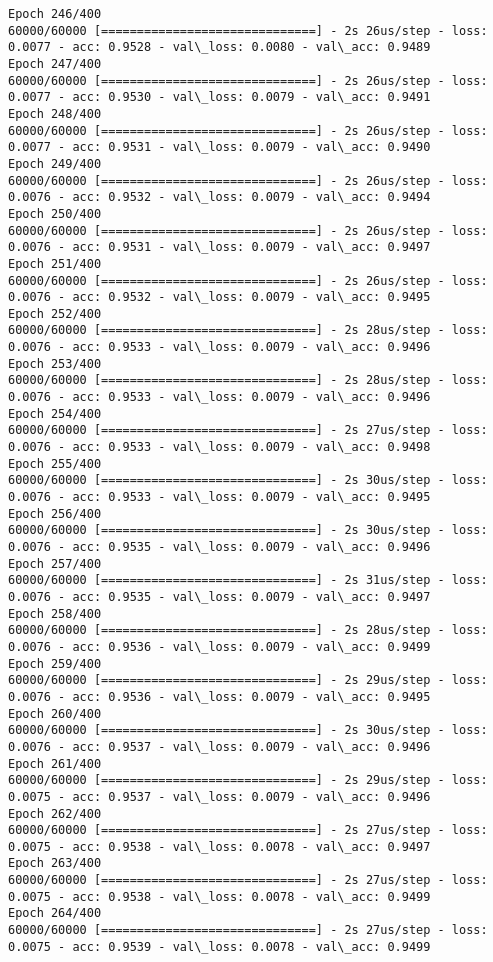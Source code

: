 \documentclass[11pt]{article}
\begin{document}
\begin{Verbatim}[commandchars=\\\{\}]
Epoch 246/400
60000/60000 [==============================] - 2s 26us/step - loss: 0.0077 - acc: 0.9528 - val\_loss: 0.0080 - val\_acc: 0.9489
Epoch 247/400
60000/60000 [==============================] - 2s 26us/step - loss: 0.0077 - acc: 0.9530 - val\_loss: 0.0079 - val\_acc: 0.9491
Epoch 248/400
60000/60000 [==============================] - 2s 26us/step - loss: 0.0077 - acc: 0.9531 - val\_loss: 0.0079 - val\_acc: 0.9490
Epoch 249/400
60000/60000 [==============================] - 2s 26us/step - loss: 0.0076 - acc: 0.9532 - val\_loss: 0.0079 - val\_acc: 0.9494
Epoch 250/400
60000/60000 [==============================] - 2s 26us/step - loss: 0.0076 - acc: 0.9531 - val\_loss: 0.0079 - val\_acc: 0.9497
Epoch 251/400
60000/60000 [==============================] - 2s 26us/step - loss: 0.0076 - acc: 0.9532 - val\_loss: 0.0079 - val\_acc: 0.9495
Epoch 252/400
60000/60000 [==============================] - 2s 28us/step - loss: 0.0076 - acc: 0.9533 - val\_loss: 0.0079 - val\_acc: 0.9496
Epoch 253/400
60000/60000 [==============================] - 2s 28us/step - loss: 0.0076 - acc: 0.9533 - val\_loss: 0.0079 - val\_acc: 0.9496
Epoch 254/400
60000/60000 [==============================] - 2s 27us/step - loss: 0.0076 - acc: 0.9533 - val\_loss: 0.0079 - val\_acc: 0.9498
Epoch 255/400
60000/60000 [==============================] - 2s 30us/step - loss: 0.0076 - acc: 0.9533 - val\_loss: 0.0079 - val\_acc: 0.9495
Epoch 256/400
60000/60000 [==============================] - 2s 30us/step - loss: 0.0076 - acc: 0.9535 - val\_loss: 0.0079 - val\_acc: 0.9496
Epoch 257/400
60000/60000 [==============================] - 2s 31us/step - loss: 0.0076 - acc: 0.9535 - val\_loss: 0.0079 - val\_acc: 0.9497
Epoch 258/400
60000/60000 [==============================] - 2s 28us/step - loss: 0.0076 - acc: 0.9536 - val\_loss: 0.0079 - val\_acc: 0.9499
Epoch 259/400
60000/60000 [==============================] - 2s 29us/step - loss: 0.0076 - acc: 0.9536 - val\_loss: 0.0079 - val\_acc: 0.9495
Epoch 260/400
60000/60000 [==============================] - 2s 30us/step - loss: 0.0076 - acc: 0.9537 - val\_loss: 0.0079 - val\_acc: 0.9496
Epoch 261/400
60000/60000 [==============================] - 2s 29us/step - loss: 0.0075 - acc: 0.9537 - val\_loss: 0.0079 - val\_acc: 0.9496
Epoch 262/400
60000/60000 [==============================] - 2s 27us/step - loss: 0.0075 - acc: 0.9538 - val\_loss: 0.0078 - val\_acc: 0.9497
Epoch 263/400
60000/60000 [==============================] - 2s 27us/step - loss: 0.0075 - acc: 0.9538 - val\_loss: 0.0078 - val\_acc: 0.9499
Epoch 264/400
60000/60000 [==============================] - 2s 27us/step - loss: 0.0075 - acc: 0.9539 - val\_loss: 0.0078 - val\_acc: 0.9499

\end{Verbatim}
\end{document}

